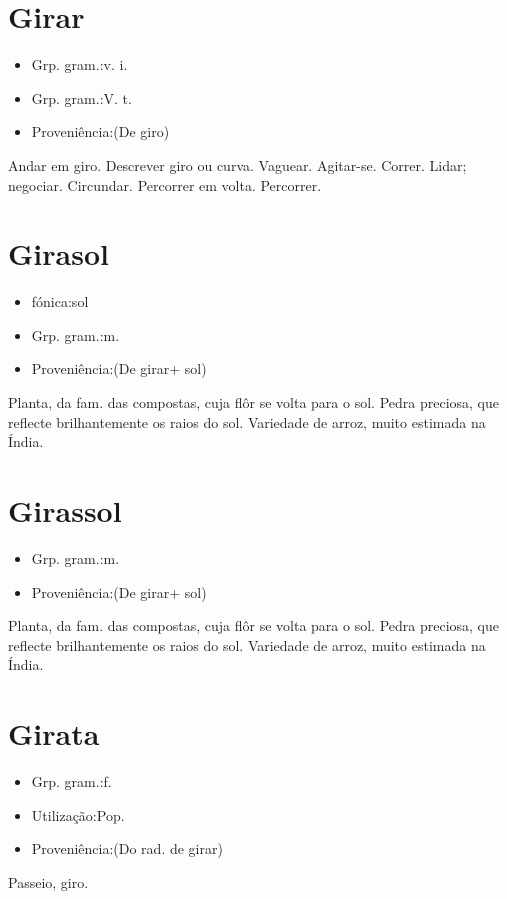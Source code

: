 \section{Girar}
\begin{itemize}
\item {Grp. gram.:v. i.}
\end{itemize}
\begin{itemize}
\item {Grp. gram.:V. t.}
\end{itemize}
\begin{itemize}
\item {Proveniência:(De \textunderscore giro\textunderscore )}
\end{itemize}
Andar em giro.
Descrever giro ou curva.
Vaguear.
Agitar-se.
Correr.
Lidar; negociar.
Circundar.
Percorrer em volta.
Percorrer.
\section{Girasol}
\begin{itemize}
\item {fónica:sol}
\end{itemize}
\begin{itemize}
\item {Grp. gram.:m.}
\end{itemize}
\begin{itemize}
\item {Proveniência:(De \textunderscore girar\textunderscore  + \textunderscore sol\textunderscore )}
\end{itemize}
Planta, da fam. das compostas, cuja flôr se volta para o sol.
Pedra preciosa, que reflecte brilhantemente os raios do sol.
Variedade de arroz, muito estimada na Índia.
\section{Girassol}
\begin{itemize}
\item {Grp. gram.:m.}
\end{itemize}
\begin{itemize}
\item {Proveniência:(De \textunderscore girar\textunderscore  + \textunderscore sol\textunderscore )}
\end{itemize}
Planta, da fam. das compostas, cuja flôr se volta para o sol.
Pedra preciosa, que reflecte brilhantemente os raios do sol.
Variedade de arroz, muito estimada na Índia.
\section{Girata}
\begin{itemize}
\item {Grp. gram.:f.}
\end{itemize}
\begin{itemize}
\item {Utilização:Pop.}
\end{itemize}
\begin{itemize}
\item {Proveniência:(Do rad. de \textunderscore girar\textunderscore )}
\end{itemize}
Passeio, giro.
